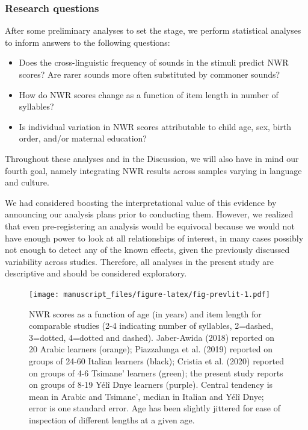 \documentclass[english,,man,floatsintext]{apa6}
\providecommand{\tightlist}{%
  \setlength{\itemsep}{0pt}\setlength{\parskip}{0pt}}
\begin{document}
\hypertarget{research-questions}{%
\subsubsection{Research questions}\label{research-questions}}

After some preliminary analyses to set the stage, we perform statistical analyses to inform answers to the following questions:

\begin{itemize}
\tightlist
\item
  Does the cross-linguistic frequency of sounds in the stimuli predict NWR scores? Are rarer sounds more often substituted by commoner sounds?
\item
  How do NWR scores change as a function of item length in number of syllables?
\item
  Is individual variation in NWR scores attributable to child age, sex, birth order, and/or maternal education?
\end{itemize}

Throughout these analyses and in the Discussion, we will also have in mind our fourth goal, namely integrating NWR results across samples varying in language and culture.

We had considered boosting the interpretational value of this evidence by announcing our analysis plans prior to conducting them. However, we realized that even pre-registering an analysis would be equivocal because we would not have enough power to look at all relationships of interest, in many cases possibly not enough to detect any of the known effects, given the previously discussed variability across studies. Therefore, all analyses in the present study are descriptive and should be considered exploratory.

\begin{figure}
\centering
\texttt{[image: manuscript\_files/figure-latex/fig-prevlit-1.pdf]}
\caption{\label{fig:fig-prevlit}NWR scores as a function of age (in years) and item length for comparable studies (2-4 indicating number of syllables, 2=dashed, 3=dotted, 4=dotted and dashed). Jaber-Awida (2018) reported on 20 Arabic learners (orange); Piazzalunga et al. (2019) reported on groups of 24-60 Italian learners (black); Cristia et al. (2020) reported on groups of 4-6 Tsimane' learners (green); the present study reports on groups of 8-19 Yélî Dnye learners (purple). Central tendency is mean in Arabic and Tsimane', median in Italian and Yélî Dnye; error is one standard error. Age has been slightly jittered for ease of inspection of different lengths at a given age.}
\end{figure}
\end{document}

